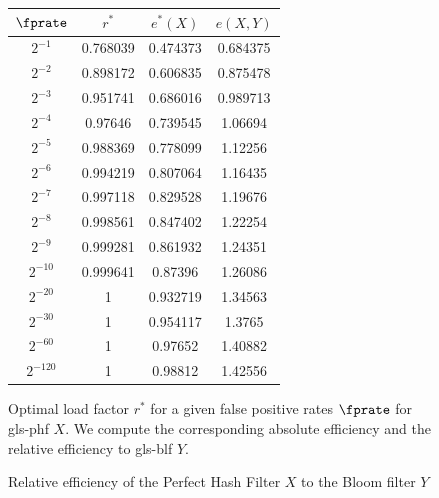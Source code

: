 \documentclass[ ../main.tex]{subfiles}
\begin{document}
\begin{figure}
\centering
\caption{Optimal load factor $r^*$ for a given false positive rates $\fprate$ for \gls{gls-phf} $X$. We compute the corresponding absolute efficiency and the relative efficiency to \gls{gls-blf} $Y$.}
\label{fig:abs_eff}
\begin{tabular}{c *{3}{S[table-auto-round,
                 table-format=-1.3]}}
{$\fprate$} & {$r^*$} & {$e^*(X)$} & {$e(X,Y)$}\\
\hline
$2^{-1}$  & 0.768039 & 0.474373 & 0.684375\\
$2^{-2}$  & 0.898172 & 0.606835 & 0.875478\\
$2^{-3}$  & 0.951741 & 0.686016 & 0.989713\\
$2^{-4}$  & 0.97646 & 0.739545 & 1.06694\\
$2^{-5}$  & 0.988369 & 0.778099 & 1.12256\\
$2^{-6}$  & 0.994219 & 0.807064 & 1.16435\\
$2^{-7}$  & 0.997118 & 0.829528 & 1.19676\\
$2^{-8}$  & 0.998561 & 0.847402 & 1.22254\\
$2^{-9}$  & 0.999281 & 0.861932 & 1.24351\\
$2^{-10}$ & 0.999641 & 0.87396 & 1.26086\\
$2^{-20}$ & 1 & 0.932719 & 1.34563\\
$2^{-30}$ & 1 & 0.954117 & 1.3765\\
$2^{-60}$ & 1 & 0.97652 & 1.40882\\
$2^{-120}$ & 1 & 0.98812 & 1.42556\\
\end{tabular}
\end{figure}

\begin{figure}
\caption{Relative efficiency of the Perfect Hash Filter $X$ to the Bloom filter $Y$}
\label{fig:rel_eff_bf_PHF}
\centering
{}
\end{figure}
\end{document}
